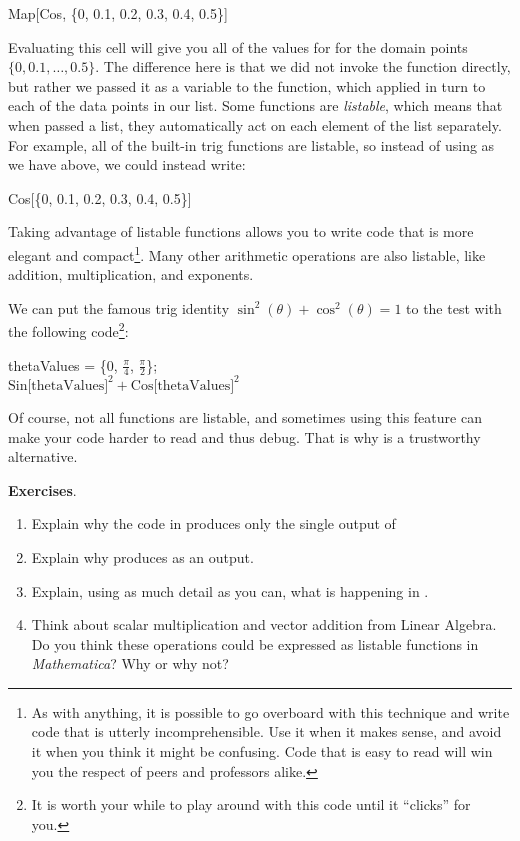 \begin{code}
	   Map[Cos, \{0, 0.1, 0.2, 0.3, 0.4, 0.5\}]\\
\end{code}

Evaluating this cell will give you all of the values for  for the domain points $\{0, 0.1, \dots, 0.5\}$. The difference here is that we did not invoke the  function directly, but rather we passed it as a variable to the  function, which applied  in turn to each of the data points in our list. 
Some functions are \emph{listable}, which means that when passed a list, they automatically act on each element of the list separately. For example, all of the built-in trig functions are listable, so instead of using  as we have above, we could instead write:

\begin{code}
	   Cos[\{0, 0.1, 0.2, 0.3, 0.4, 0.5\}]
\end{code}

Taking advantage of listable functions allows you to write code that is more elegant and compact\footnote{As with anything, it is possible to go overboard with this technique and write code that is utterly incomprehensible. Use it when it makes sense, and avoid it when you think it might be confusing. Code that is easy to read will win you the respect of peers and professors alike.}. Many other arithmetic operations are also listable, like addition, multiplication, and exponents. 

We can put the famous trig identity $\sin^2(\theta) + \cos^2(\theta) = 1$ to the test with the following code\footnote{It is worth your while to play around with this code until it ``clicks'' for you.}:

\begin{code}
	   \label{code:SineSquaredPlusCosineSquared}
	   thetaValues = \{0, $\frac{\pi}{4}$, $\frac{\pi}{2}$\};\\
	   $\text{Sin[thetaValues]}^2 + \text{Cos[thetaValues]}^2$\\
\end{code}

Of course, not all functions are listable, and sometimes using this feature can make your code harder to read and thus debug. That is why  is a trustworthy alternative. 

{\bf Exercises}. 
\begin{enumerate}
	   \item Explain why the code in  produces only the single output of 
	   \item Explain why  produces  as an output.
	   \item Explain, using as much detail as you can, what is happening in .
	   \item Think about scalar multiplication and vector addition from Linear Algebra. Do you think these operations could be expressed as listable functions in \emph{Mathematica}? Why or why not?
\end{enumerate}
